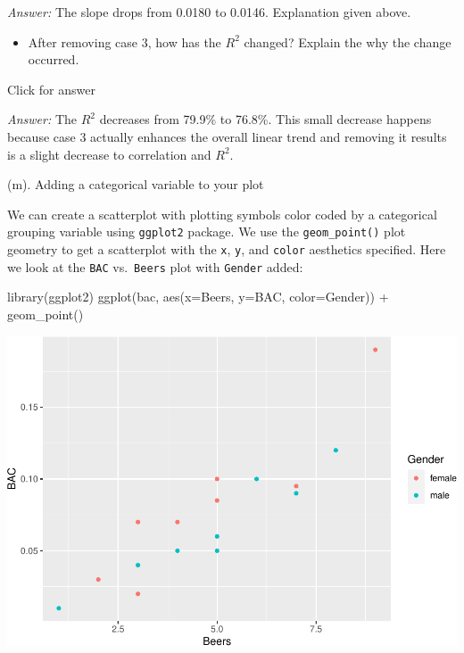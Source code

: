 \documentclass[
]{book}
\newenvironment{Shaded}{\begin{snugshade}}{\end{snugshade}}
\newcommand{\AttributeTok}[1]{\textcolor[rgb]{0.77,0.63,0.00}{#1}}
\newcommand{\FunctionTok}[1]{\textcolor[rgb]{0.00,0.00,0.00}{#1}}
\newcommand{\NormalTok}[1]{#1}
\newcommand{\SpecialCharTok}[1]{\textcolor[rgb]{0.00,0.00,0.00}{#1}}
\providecommand{\tightlist}{%
  \setlength{\itemsep}{0pt}\setlength{\parskip}{0pt}}
\begin{document}
\emph{Answer:} The slope drops from 0.0180 to 0.0146. Explanation given above.

\begin{itemize}
\tightlist
\item
  After removing case 3, how has the \(R^2\) changed? Explain the why the change occurred.
\end{itemize}

Click for answer

\emph{Answer:} The \(R^2\) decreases from 79.9\% to 76.8\%. This small decrease happens because case 3 actually enhances the overall linear trend and removing it results is a slight decrease to correlation and \(R^2\).

(m). Adding a categorical variable to your plot

We can create a scatterplot with plotting symbols color coded by a categorical grouping variable using \texttt{ggplot2} package. We use the \texttt{geom\_point()} plot geometry to get a scatterplot with the \texttt{x}, \texttt{y}, and \texttt{color} aesthetics specified. Here we look at the \texttt{BAC} vs.~\texttt{Beers} plot with \texttt{Gender} added:

\begin{Shaded}
\begin{Highlighting}[]
\FunctionTok{library}\NormalTok{(ggplot2)}
\FunctionTok{ggplot}\NormalTok{(bac, }\FunctionTok{aes}\NormalTok{(}\AttributeTok{x=}\NormalTok{Beers, }\AttributeTok{y=}\NormalTok{BAC, }\AttributeTok{color=}\NormalTok{Gender)) }\SpecialCharTok{+} \FunctionTok{geom\_point}\NormalTok{()}
\end{Highlighting}
\end{Shaded}

\includegraphics[width=1\linewidth]{Class_Activity_6_files/figure-latex/unnamed-chunk-19-1}
\end{document}
